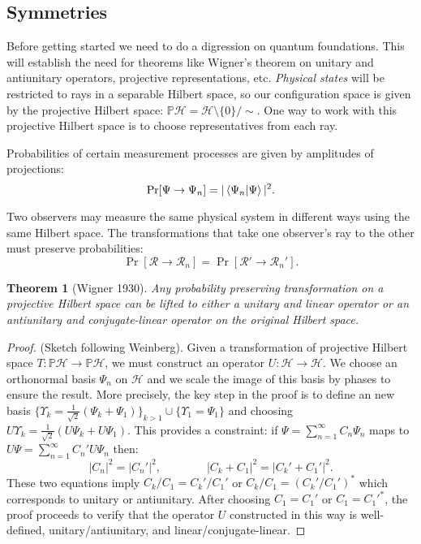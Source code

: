 \documentclass[10pt]{article}
\newcommand{\PH}{\mbb P\ms H}
\newcommand{\mc}{\mathcal}
\newcommand{\ms}{\mathscr}
\newcommand{\mbb}{\mathbb}
\newcommand{\FR}[2]{\frac{#1}{#2}}
\theoremstyle{plain}
\newtheorem{theorem}{Theorem}[section]
\theoremstyle{definition}
\theoremstyle{remark}
\def\sm{\setminus}
\begin{document}
\subsection{Symmetries} \label{section:symmetries}
Before getting started we need to do a digression on quantum foundations.
This will establish the need for theorems like Wigner's theorem on unitary
and antiunitary operators, projective representations, etc. \emph{Physical
states} will be restricted to rays in a separable Hilbert space, so our
configuration space is given by the projective Hilbert space: \(\mbb P
\ms H = \ms H\sm\{0\}/\sim\). One way to work with this projective Hilbert
space is to choose representatives from each ray. %

Probabilities of certain measurement processes are given by amplitudes of
projections: \[\Pr[\Psi \to \Psi_n] = |\braket{\Psi_n|\Psi}|^2.\]

Two observers may measure the same physical system in different ways using
the same Hilbert space. The transformations that take one observer's ray to
the other must preserve probabilities: \[ \Pr[\ms R \to \ms R_n] = \Pr[\ms
R'\to\ms R_n'].\]
\begin{theorem}[Wigner 1930]\label{th:Wigner1930} Any probability
preserving transformation on a projective Hilbert space can be lifted to
either a unitary and linear operator or an antiunitary and conjugate-linear
operator on the original Hilbert space.
\end{theorem}
\begin{proof}(Sketch following Weinberg). Given a transformation of
projective Hilbert space \(T\colon \PH\to\PH\), we must construct an operator
\(U\colon \ms H \to\ms H\). We choose an orthonormal basis \(\Psi_n\) on
\(\mc H\) and we scale the image of this basis by phases to ensure the
result. More precisely, the key step in the proof is to define an new
basis \(\{\Upsilon_k = \FR{1}{\sqrt 2}\left( \Psi_k+\Psi_1
\right)\}_{k>1} \cup \{\Upsilon_1 = \Psi_1\}\) and choosing
\(U\Upsilon_k = \FR{1}{\sqrt 2}\left( U\Psi_k + U\Psi_1 \right).\)
This provides a constraint: if \(\Psi = \sum_{n=1}^\infty C_n\Psi_n\)
maps to \(U\Psi = \sum_{n=1}^\infty C_n' U\Psi_n\) then: \[|C_n|^2 =
|C_n'|^2,\qquad\qquad |C_k+C_1|^2 = |C_k'+C_1'|^2.\] These two
equations imply \(C_k/C_1 = C_k'/C_1'\) or \(C_k/C_1 = (C_k'/C_1')^*\)
which corresponds to unitary or antiunitary.  After choosing
\(C_1=C_1'\) or \(C_1=C_1'^*\), the proof proceeds to verify that the
operator \(U\) constructed in this way is well-defined,
unitary/antiunitary, and linear/conjugate-linear.
\end{proof}
\end{document}
